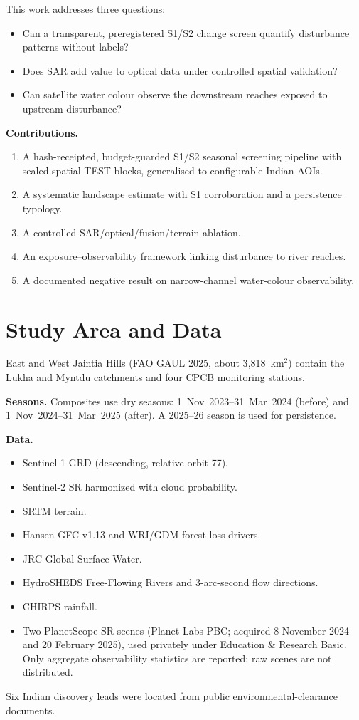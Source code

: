 \documentclass[conference]{IEEEtran}
\begin{document}
This work addresses three questions:
\begin{itemize}
\item Can a transparent, preregistered S1/S2 change screen quantify disturbance patterns without labels?
\item Does SAR add value to optical data under controlled spatial validation?
\item Can satellite water colour observe the downstream reaches exposed to upstream disturbance?
\end{itemize}

\textbf{Contributions.}
\begin{enumerate}
\item A hash-receipted, budget-guarded S1/S2 seasonal screening pipeline with sealed spatial TEST blocks, generalised to configurable Indian AOIs.
\item A systematic landscape estimate with S1 corroboration and a persistence typology.
\item A controlled SAR/optical/fusion/terrain ablation.
\item An exposure--observability framework linking disturbance to river reaches.
\item A documented negative result on narrow-channel water-colour observability.
\end{enumerate}

\section{Study Area and Data}
East and West Jaintia Hills (FAO GAUL 2025, about 3{,}818~km$^2$) contain the Lukha and Myntdu catchments and four CPCB monitoring stations.

\textbf{Seasons.} Composites use dry seasons: 1~Nov~2023--31~Mar~2024 (before) and 1~Nov~2024--31~Mar~2025 (after). A 2025--26 season is used for persistence.

\textbf{Data.}
\begin{itemize}
\item Sentinel-1 GRD (descending, relative orbit 77).
\item Sentinel-2 SR harmonized with cloud probability.
\item SRTM terrain.
\item Hansen GFC v1.13 and WRI/GDM forest-loss drivers.
\item JRC Global Surface Water.
\item HydroSHEDS Free-Flowing Rivers and 3-arc-second flow directions.
\item CHIRPS rainfall.
\item Two PlanetScope SR scenes (Planet Labs PBC; acquired 8 November 2024 and 20 February 2025), used privately under Education \& Research Basic. Only aggregate observability statistics are reported; raw scenes are not distributed.
\end{itemize}
Six Indian discovery leads were located from public environmental-clearance documents.
\end{document}
